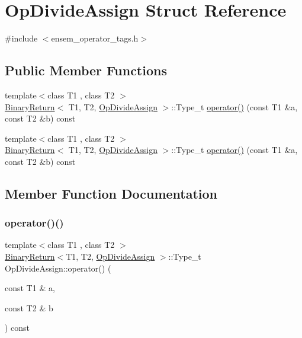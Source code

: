 \hypertarget{structOpDivideAssign}{}\section{Op\+Divide\+Assign Struct Reference}
\label{structOpDivideAssign}


{\ttfamily \#include $<$ensem\+\_\+operator\+\_\+tags.\+h$>$}

\subsection*{Public Member Functions}
\begin{DoxyCompactItemize}
\item 
{\footnotesize template$<$class T1 , class T2 $>$ }\\\mbox{\hyperlink{structBinaryReturn}{Binary\+Return}}$<$ T1, T2, \mbox{\hyperlink{structOpDivideAssign}{Op\+Divide\+Assign}} $>$\+::Type\+\_\+t \mbox{\hyperlink{structOpDivideAssign_a805531d103a9b37b9eb9ff4debaf5e41}{operator()}} (const T1 \&a, const T2 \&b) const
\item 
{\footnotesize template$<$class T1 , class T2 $>$ }\\\mbox{\hyperlink{structBinaryReturn}{Binary\+Return}}$<$ T1, T2, \mbox{\hyperlink{structOpDivideAssign}{Op\+Divide\+Assign}} $>$\+::Type\+\_\+t \mbox{\hyperlink{structOpDivideAssign_a805531d103a9b37b9eb9ff4debaf5e41}{operator()}} (const T1 \&a, const T2 \&b) const
\end{DoxyCompactItemize}


\subsection{Member Function Documentation}
\mbox{\label{structOpDivideAssign_a805531d103a9b37b9eb9ff4debaf5e41}} 
\subsubsection{\texorpdfstring{operator()()}{operator()()}\hspace{0.1cm}{\footnotesize\ttfamily [1/2]}}
{\footnotesize\ttfamily template$<$class T1 , class T2 $>$ \\
\mbox{\hyperlink{structBinaryReturn}{Binary\+Return}}$<$T1, T2, \mbox{\hyperlink{structOpDivideAssign}{Op\+Divide\+Assign}} $>$\+::Type\+\_\+t Op\+Divide\+Assign\+::operator() (\begin{DoxyParamCaption}\item[{const T1 \&}]{a,  }\item[{const T2 \&}]{b }\end{DoxyParamCaption}) const\hspace{0.3cm}{\ttfamily [inline]}}

